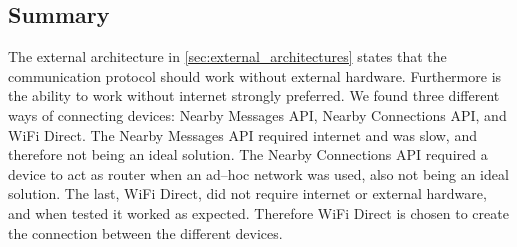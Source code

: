 \subsection{Summary}
The external architecture in \cref{sec:external_architectures} states that the communication protocol should work without external hardware.
Furthermore is the ability to work without internet strongly preferred.
We found three different ways of connecting devices: Nearby Messages API, Nearby Connections API, and WiFi Direct.
The Nearby Messages API required internet and was slow, and therefore not being an ideal solution.
The Nearby Connections API required a device to act as router when an ad--hoc network was used, also not being an ideal solution.
The last, WiFi Direct, did not require internet or external hardware, and when tested it worked as expected.
Therefore WiFi Direct is chosen to create the connection between the different devices. 
